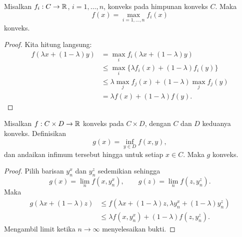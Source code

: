 \begin{lemma}
    Misalkan $f_i:C\rightarrow\mathbb{R}$, $i=1,\dots,n$, konveks pada himpunan konveks $C$. Maka
    \begin{equation}
        f(x)=\max_{i=1,\dots,n}f_i(x)
    \end{equation}
    konveks.
\end{lemma}
\begin{proof}
    Kita hitung langsung:
    \begin{equation}
        \begin{aligned}
            f(\lambda x+(1-\lambda)y)
            &=\max_i f_i(\lambda x+(1-\lambda)y)\\
            &\leq\max_i\{\lambda f_i(x)+(1-\lambda)f_i(y)\}\\
            &\leq\lambda\max_jf_j(x)+(1-\lambda)\max_jf_j(y)\\
            &=\lambda f(x)+(1-\lambda)f(y).
        \end{aligned}
    \end{equation}
\end{proof}

\begin{theorem}\label{convexity:thm:minimum}
    Misalkan $f:C\times D\rightarrow\mathbb{R}$ konveks pada $C\times D$, dengan $C$ dan $D$ keduanya konveks. Definisikan
    \begin{equation}
        g(x)=\inf_{y\in D}f(x,y),
    \end{equation}
    dan andaikan infimum tersebut hingga untuk setiap $x\in C$. Maka $g$ konveks.
\end{theorem}
\begin{proof}
    Pilih barisan $y_n^x$ dan $y_n^z$ sedemikian sehingga
    \begin{equation}
        g(x)=\lim_n f(x,y_n^x),\qquad g(z)=\lim_n f(z,y_n^z).
    \end{equation}
    Maka
    \begin{equation}
        \begin{aligned}
            g(\lambda x+(1-\lambda)z)
            &\leq f(\lambda x+(1-\lambda)z,\lambda y_n^x+(1-\lambda)y_n^z)\\
            &\leq\lambda f(x,y_n^x)+(1-\lambda)f(z,y_n^z).
        \end{aligned}
    \end{equation}
    Mengambil limit ketika $n\rightarrow\infty$ menyelesaikan bukti.
\end{proof}

